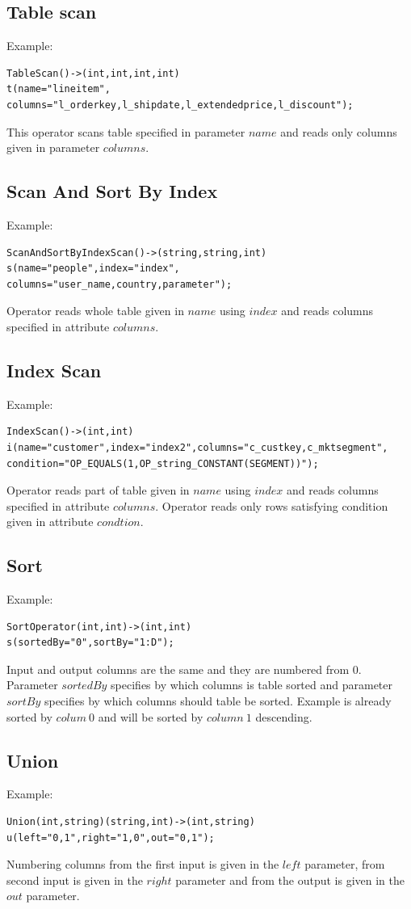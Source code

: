 \subsection{Table scan}
Example:
\begin{lstlisting}
TableScan()->(int,int,int,int)
t(name="lineitem",
columns="l_orderkey,l_shipdate,l_extendedprice,l_discount");
\end{lstlisting}
This operator scans table specified in parameter $name$ and reads only columns given in parameter $columns$.

\subsection{Scan And Sort By Index}
Example:
\begin{lstlisting}
ScanAndSortByIndexScan()->(string,string,int)
s(name="people",index="index",
columns="user_name,country,parameter"); 
\end{lstlisting}
Operator reads whole table given in $name$ using $index$ and reads columns specified in attribute $columns$.

\subsection{Index Scan}

Example:
\begin{lstlisting}
IndexScan()->(int,int)
i(name="customer",index="index2",columns="c_custkey,c_mktsegment",
condition="OP_EQUALS(1,OP_string_CONSTANT(SEGMENT))");
\end{lstlisting}
Operator reads part of table given in $name$ using $index$ and reads columns specified in attribute $columns$. Operator reads only rows satisfying condition given in attribute $condtion$.



\subsection{Sort}
Example:
\begin{lstlisting}
SortOperator(int,int)->(int,int)
s(sortedBy="0",sortBy="1:D");
\end{lstlisting}
Input and output columns are the same and they are numbered from 0. Parameter $sortedBy$ specifies by which columns is table sorted and parameter $sortBy$ specifies by which columns should table be sorted. Example is already sorted by $colum~0$ and will be sorted by $column~1$ descending.


\subsection{Union}
Example:
\begin{lstlisting}
Union(int,string)(string,int)->(int,string)
u(left="0,1",right="1,0",out="0,1");
\end{lstlisting}
Numbering columns from the first input is given in the $left$ parameter, from second input is given in the $right$ parameter and from the output is given in the $out$ parameter.

